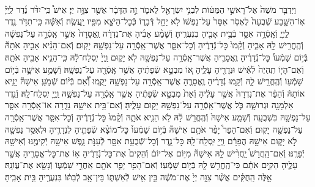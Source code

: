 \documentclass[twoside, openany, parskip=half, 11pt]{book}
\begin{document}
\begin{footnotesize}
\begin{multicols}{2}
\\
וַיְדַבֵּ֤ר מֹשֶׁה֙ אֶל־רָאשֵׁ֣י הַמַּטּ֔וֹת לִבְנֵ֥י יִשְׂרָאֵ֖ל לֵאמֹ֑ר זֶ֣ה הַדָּבָ֔ר אֲשֶׁ֖ר צִוָּ֥ה יְיָ׃ אִישׁ֩ כִּֽי־יִדֹּ֨ר נֶ֜דֶר לַֽיְיָ֗ אֽוֹ־הִשָּׁ֤בַע שְֿׁבֻעָה֙ לֶאְסֹ֤ר אִסָּר֙ עַל־נַפְשׁ֔וֹ לֹ֥א יַחֵ֖ל דְּֿבָר֑וֹ כְּֿכׇל־הַיֹּצֵ֥א מִפִּ֖יו יַֽעֲשֶֽׂה׃ וְֿאִשָּׁ֕ה כִּֽי־תִדֹּ֥ר נֶ֖דֶר לַֽיְיָ֑ וְֿאָֽסְֿרָ֥ה אִסָּ֛ר בְּֿבֵ֥ית אָבִ֖יהָ בִּנְעֻרֶֽיהָ׃ וְֿשָׁמַ֨ע אָבִ֜יהָ אֶת־נִדְרָ֗הּ וֶֽאֱסָרָהּ֙ אֲשֶׁ֣ר אָֽסְֿרָ֣ה עַל־נַפְשָׁ֔הּ וְֿהֶֽחֱרִ֥ישׁ לָ֖הּ אָבִ֑יהָ וְֿקָ֨מוּ֙ כׇּל־נְֿדָרֶ֔יהָ וְֿכׇל־אִסָּ֛ר אֲשֶׁר־אָֽסְֿרָ֥ה עַל־נַפְשָׁ֖הּ יָקֽוּם׃ וְֿאִם־הֵנִ֨יא אָבִ֣יהָ אֹתָהּ֘ בְּֿי֣וֹם שָׁמְֿעוֹ֒ כׇּל־נְֿדָרֶ֗יהָ וֶֽאֱסָרֶ֛יהָ אֲשֶׁר־אָֽסְֿרָ֥ה עַל־נַפְשָׁ֖הּ לֹ֣א יָק֑וּם וַֽיְיָ֙ יִֽסְלַח־לָ֔הּ כִּֽי־הֵנִ֥יא אָבִ֖יהָ אֹתָֽהּ׃ וְֿאִם־הָי֤וֹ תִֽהְיֶה֙ לְֿאִ֔ישׁ וּנְדָרֶ֖יהָ עָלֶ֑יהָ א֚וֹ מִבְטָ֣א שְֿׂפָתֶ֔יהָ אֲשֶׁ֥ר אָֽסְֿרָ֖ה עַל־נַפְשָֽׁהּ׃ וְֿשָׁמַ֥ע אִישָׁ֛הּ בְּֿי֥וֹם שָׁמְֿע֖וֹ וְֿהֶֽחֱרִ֣ישׁ לָ֑הּ וְֿקָ֣מוּ נְֿדָרֶ֗יהָ וֶֽאֱסָרֶ֛הָ אֲשֶׁר־אָֽסְֿרָ֥ה עַל־נַפְשָׁ֖הּ יָקֻֽמוּ׃ וְֿ֠אִ֠ם בְּֿי֨וֹם שְֿׁמֹ֣עַֽ אִישָׁהּ֘ יָנִ֣יא אוֹתָהּ֒ וְֿהֵפֵ֗ר אֶת־נִדְרָהּ֙ אֲשֶׁ֣ר עָלֶ֔יהָ וְֿאֵת֙ מִבְטָ֣א שְֿׂפָתֶ֔יהָ אֲשֶׁ֥ר אָֽסְֿרָ֖ה עַל־נַפְשָׁ֑הּ וַֽיְיָ֖ יִֽסְלַֽח־לָֽהּ׃  וְֿנֵ֥דֶר אַלְמָנָ֖ה וּגְרוּשָׁ֑ה כֹּ֛ל אֲשֶׁר־אָֽסְֿרָ֥ה עַל־נַפְשָׁ֖הּ יָק֥וּם עָלֶֽיהָ׃ וְֿאִם־בֵּ֥ית אִישָׁ֖הּ נָדָ֑רָה אוֹ־אָֽסְֿרָ֥ה אִסָּ֛ר עַל־נַפְשָׁ֖הּ בִּשְׁבֻעָֽה׃ וְֿשָׁמַ֤ע אִישָׁהּ֙ וְֿהֶֽחֱרִ֣שׁ לָ֔הּ לֹ֥א הֵנִ֖יא אֹתָ֑הּ וְֿקָ֨מוּ֙ כׇּל־נְֿדָרֶ֔יהָ וְֿכׇל־אִסָּ֛ר אֲשֶׁר־אָֽסְֿרָ֥ה עַל־נַפְשָׁ֖הּ יָקֽוּם׃ וְֿאִם־הָפֵר֩ יָפֵ֨ר אֹתָ֥ם אִישָׁהּ֘ בְּֿי֣וֹם שָׁמְֿעוֹ֒ כׇּל־מוֹצָ֨א שְֿׂפָתֶ֧יהָ לִנְדָרֶ֛יהָ וּלְאִסַּ֥ר נַפְשָׁ֖הּ לֹ֣א יָק֑וּם אִישָׁ֣הּ הֲפֵרָ֔ם וַֽיְיָ֖ יִֽסְלַֽח־לָֽהּ׃  כׇּל־נֵ֛דֶר וְֿכׇל־שְֿׁבֻעַ֥ת אִסָּ֖ר לְֿעַנֹּ֣ת נָ֑פֶשׁ אִישָׁ֥הּ יְֿקִימֶ֖נּוּ וְֿאִישָׁ֥הּ יְֿפֵרֶֽנּוּ׃ וְֿאִם־הַֽחֲרֵשׁ֩ יַֽחֲרִ֨ישׁ לָ֥הּ אִישָׁהּ֘ מִיּ֣וֹם אֶל־יוֹם֒ וְֿהֵקִים֙ אֶת־כׇּל־נְֿדָרֶ֔יהָ א֥וֹ אֶת־כׇּל־אֱסָרֶ֖יהָ אֲשֶׁ֣ר עָלֶ֑יהָ הֵקִ֣ים אֹתָ֔ם כִּי־הֶֽחֱרִ֥שׁ לָ֖הּ בְּֿי֥וֹם שָׁמְֿעֽוֹ׃ וְֿאִם־הָפֵ֥ר יָפֵ֛ר אֹתָ֖ם אַֽחֲרֵ֣י שָׁמְֿע֑וֹ וְֿנָשָׂ֖א אֶת־עֲוֹנָֽהּ׃ אֵ֣לֶּה הַֽחֻקִּ֗ים אֲשֶׁ֨ר צִוָּ֤ה יְיָ֙ אֶת־מֹשֶׁ֔ה בֵּ֥ין אִ֖ישׁ לְֿאִשְׁתּ֑וֹ בֵּין־אָ֣ב לְֿבִתּ֔וֹ בִּנְעֻרֶ֖יהָ בֵּ֥ית אָבִֽיהָ׃


\end{multicols}
\end{footnotesize}
\end{document}
